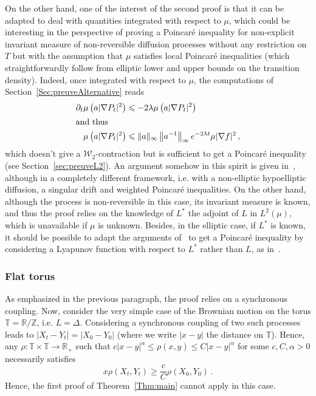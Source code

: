 \documentclass[10pt]{amsart}
\theoremstyle{definition}\newtheorem{defi}[theo]{Definition}\newtheorem{rema}[theo]{Remark}\newtheorem{exam}[theo]{Example}\newtheorem{exem}[theo]{Example}\newtheorem{nota}[theo]{Notation}
\newcommand{\R}{\mathbb R}
\newcommand{\T}{\mathbb T}
\newcommand{\Z}{\mathbb Z}
\newcommand{\clW}{\mathcal W}
\newcommand{\na}{\nabla}
\newcommand{\1}{\mathbbm{1}}
\begin{document}
On the other hand, one of the interest of the second proof is that it can be adapted to deal with quantities integrated with respect to $\mu$, which could be interesting in the perspective of proving a Poincaré inequality for non-explicit invariant measure of non-reversible diffusion processes without any restriction on $T$ but with the assumption that $\mu$ satisfies local Poincaré inequalities (which straightforwardly follow from elliptic lower and upper bounds on the transition density). Indeed, once integrated with respect to $\mu$, the computations of Section~\ref{Sec:preuveAlternative} reads
\begin{align*}
\partial_t \mu\left( a |\na P_t|^2\right) &\leqslant -2\lambda \mu\left( a |\na P_t|^2\right)
\\
\intertext{and thus}
\mu\left(a|\na P_t|^2\right) &\leqslant \|a\|_\infty \left\|a^{-1}\right\|_\infty e^{-2\lambda t} \mu|\na f|^2\,,
\end{align*}
which doesn't give a $\clW_2$-contraction but is sufficient to get a Poincaré inequality (see Section~\ref{sec:preuveL2}). An argument somehow in this spirit is given in~\cite{BaudoinGordinaHerzog}, although in a completely different framework, i.e. with a non-elliptic hypoelliptic diffusion, a singular drift and weighted Poincaré inequalities. On the other hand, although the process is non-reversible in this case, its invariant measure is known, and thus the proof relies on the knowledge of $L^*$ the adjoint of $L$ in $L^2(\mu)$, which is unavailable if $\mu$ is unknown. Besides, in the elliptic case, if $L^*$ is known, it should be possible to adapt the arguments of~\cite{BakryCattiauxGuillin,CattiauxGuillin} to get a Poincaré inequality by considering a Lyapunov function with respect to $L^*$ rather than $L$, as in~\cite{BaudoinGordinaHerzog}.



\subsubsection*{Flat torus}

As emphasized in the previous paragraph, the proof relies on a synchronous coupling. Now, consider the very simple case of the Brownian motion on the torus $\T = \R/\Z$, i.e. $L=\Delta$. Considering a synchronous coupling of two such processes leads to $|X_t-Y_t|=|X_0-Y_0|$ (where we write $|x-y|$ the distance on $\T$). Hence, any $\rho:\T\times\T\rightarrow \R_+$ such that $c|x-y|^\alpha \leqslant \rho(x,y)\leqslant C|x-y|^\alpha$ for some $c,C,\alpha>0$ necessarily satisfies
\[x
\rho(X_t,Y_t) \geqslant \frac{c}{C}\rho(X_0,Y_0)\,.
\]
Hence, the first proof of Theorem~\ref{Thm:main} cannot apply in this case.
\end{document}
